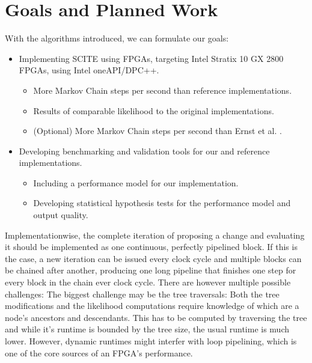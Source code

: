 \section{Goals and Planned Work}

With the algorithms introduced, we can formulate our goals:
\begin{itemize}
    \item Implementing \ac{SCITE} using \acp{FPGA}, targeting Intel Stratix 10 GX 2800 \acp{FPGA}, using Intel oneAPI/DPC++.
    \begin{itemize}
        \item More Markov Chain steps per second than reference implementations.
        \item Results of comparable likelihood to the original implementations.
        \item (Optional) More Markov Chain steps per second than Ernst et al. \cite{ernst2020Performance}.
    \end{itemize}
    \item Developing benchmarking and validation tools for our and reference implementations.
    \begin{itemize}
        \item Including a performance model for our implementation.
        \item Developing statistical hypothesis tests for the performance model and output quality.
    \end{itemize}
\end{itemize}

Implementationwise, the complete iteration of proposing a change and evaluating it should be implemented as one continuous, perfectly pipelined block. If this is the case, a new iteration can be issued every clock cycle and multiple blocks can be chained after another, producing one long pipeline that finishes one step for every block in the chain ever clock cycle. There are however multiple possible challenges: The biggest challenge may be the tree traversals: Both the tree modifications and the likelihood computations require knowledge of which are a node's ancestors and descendants. This has to be computed by traversing the tree and while it's runtime is bounded by the tree size, the usual runtime is much lower. However, dynamic runtimes might interfer with loop pipelining, which is one of the core sources of an \ac{FPGA}'s performance.

